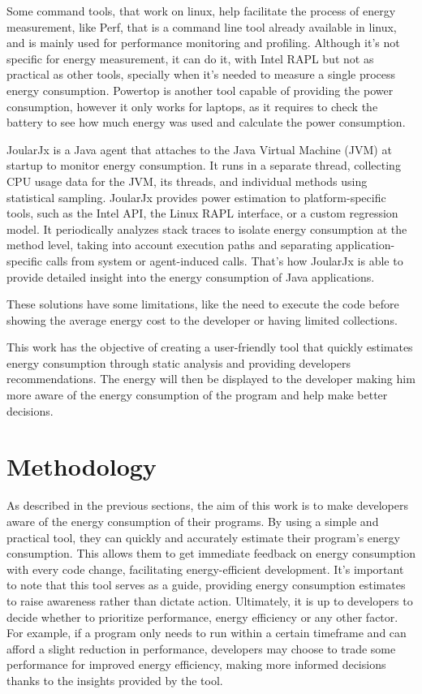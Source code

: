 \documentclass[sigplan]{acmart}
\begin{document}
Some command tools, that work on linux, help facilitate the process of energy measurement, like Perf\cite{perfwiki_main}, that is a command line tool already available in linux, and is mainly used for performance monitoring and profiling. Although it's not specific for energy measurement, it can do it, with Intel RAPL but not as practical as other tools, specially when it's needed to measure a single process energy consumption. Powertop\cite{archlinux_Powertop} is another tool capable of providing the power consumption, however it only works for laptops, as it requires to check the battery to see how much energy was used and calculate the power consumption.

JoularJx\cite{noureddine-ie-2022} is a Java agent that attaches to the Java Virtual Machine (JVM) at startup to monitor energy consumption. It runs in a separate thread, collecting CPU usage data for the JVM, its threads, and individual methods using statistical sampling. JoularJx provides power estimation to platform-specific tools, such as the Intel API, the Linux RAPL interface, or a custom regression model. It periodically analyzes stack traces to isolate energy consumption at the method level, taking into account execution paths and separating application-specific calls from system or agent-induced calls. That's how JoularJx is able to provide detailed insight into the energy consumption of Java applications.

These solutions have some limitations, like the need to execute the code before showing the average energy cost to the developer or having limited collections.

This work has the objective of creating a user-friendly tool that quickly estimates energy consumption through static analysis and providing developers recommendations. The energy will then be displayed to the developer making him more aware of the energy consumption of the program and help make better decisions.

\section{Methodology} \label{sec:work}

As described in the previous sections, the aim of this work is to make developers aware of the energy consumption of their programs. By using a simple and practical tool, they can quickly and accurately estimate their program's energy consumption. This allows them to get immediate feedback on energy consumption with every code change, facilitating energy-efficient development. It's important to note that this tool serves as a guide, providing energy consumption estimates to raise awareness rather than dictate action. Ultimately, it is up to developers to decide whether to prioritize performance, energy efficiency or any other factor. For example, if a program only needs to run within a certain timeframe and can afford a slight reduction in performance, developers may choose to trade some performance for improved energy efficiency, making more informed decisions thanks to the insights provided by the tool.
\end{document}
